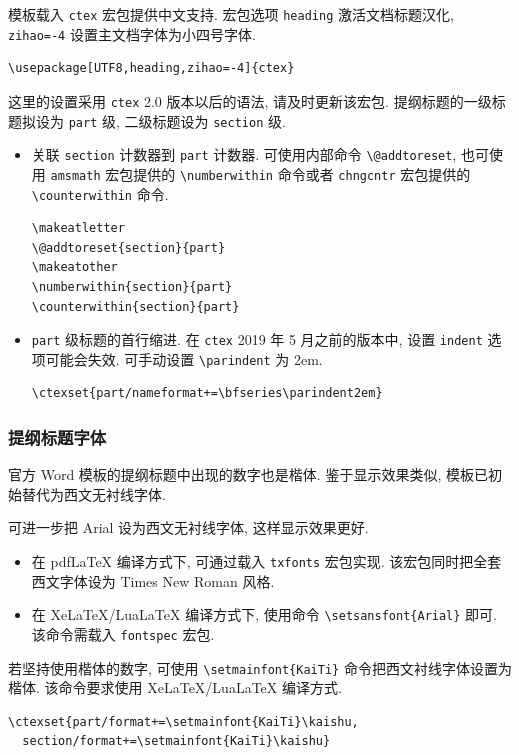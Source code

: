 \documentclass{article}
\let\kaishu\relax\newCJKfontfamily\kaishu{KaiTi}[AutoFakeBold=2.85] %
\begin{document}
模板载入 \verb'ctex' 宏包提供中文支持.
宏包选项 \verb'heading' 激活文档标题汉化, \verb'zihao=-4' 设置主文档字体为小四号字体.
\begin{verbatim}
\usepackage[UTF8,heading,zihao=-4]{ctex}
\end{verbatim}

这里的设置采用 \verb'ctex' 2.0 版本以后的语法, 请及时更新该宏包.
提纲标题的一级标题拟设为 \verb'part' 级, 二级标题设为 \verb'section' 级.
\begin{itemize}
  \item
    关联 \verb'section' 计数器到 \verb'part' 计数器.
    可使用内部命令 \verb'\@addtoreset', 也可使用 \verb'amsmath' 宏包提供的 \verb'\numberwithin' 命令或者 \verb'chngcntr' 宏包提供的 \verb'\counterwithin' 命令.
\begin{verbatim}
\makeatletter
\@addtoreset{section}{part}
\makeatother
\numberwithin{section}{part}
\counterwithin{section}{part}
\end{verbatim}
  \item
    \verb'part' 级标题的首行缩进.
    在 \verb'ctex' 2019 年 5 月之前的版本中, 设置 \verb'indent' 选项可能会失效.
    可手动设置 \verb'\parindent' 为 2em.
\begin{verbatim}
\ctexset{part/nameformat+=\bfseries\parindent2em}
\end{verbatim}
\end{itemize}

\subsubsection{提纲标题字体}

官方 Word 模板的提纲标题中出现的数字也是楷体.
鉴于显示效果类似, 模板已初始替代为西文无衬线字体.

可进一步把 Arial 设为西文无衬线字体, 这样显示效果更好.
\begin{itemize}
  \item
    在 pdfLaTeX 编译方式下, 可通过载入 \verb'txfonts' 宏包实现.
    该宏包同时把全套西文字体设为 Times New Roman 风格.
  \item
    在 XeLaTeX/LuaLaTeX 编译方式下, 使用命令 \verb'\setsansfont{Arial}' 即可.
    该命令需载入 \verb'fontspec' 宏包.
\end{itemize}

若坚持使用楷体的数字, 可使用 \verb'\setmainfont{KaiTi}' 命令把西文衬线字体设置为楷体.
该命令要求使用 XeLaTeX/LuaLaTeX 编译方式.
\begin{verbatim}
\ctexset{part/format+=\setmainfont{KaiTi}\kaishu,
  section/format+=\setmainfont{KaiTi}\kaishu}
\end{verbatim}
\end{document}
